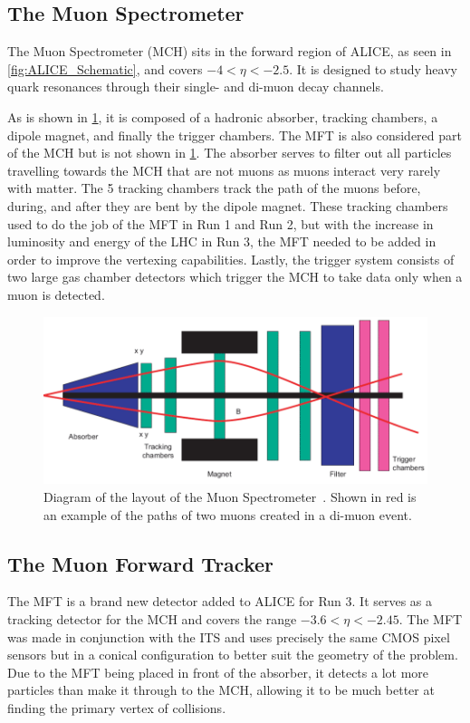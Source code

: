 \documentclass[11pt]{article}
\numberwithin{equation}{section}
\numberwithin{figure}{section}
\numberwithin{table}{section}
\begin{document}
\subsection{The Muon Spectrometer}
The Muon Spectrometer (MCH) sits in the forward region of ALICE, as seen in \cref{fig:ALICE_Schematic}, and covers $-4<\eta<-2.5$. It is designed to study heavy quark resonances through their single- and di-muon decay channels.

As is shown in \cref{fig:Muon Spectrometer}, it is composed of a hadronic absorber, tracking chambers, a dipole magnet, and finally the trigger chambers. The MFT is also considered part of the MCH but is not shown in \cref{fig:Muon Spectrometer}. The absorber serves to filter out all particles travelling towards the MCH that are not muons as muons interact very rarely with matter. The 5 tracking chambers track the path of the muons before, during, and after they are bent by the dipole magnet. These tracking chambers used to do the job of the MFT in Run 1 and Run 2, but with the increase in luminosity and energy of the LHC in Run 3, the MFT needed to be added in order to improve the vertexing capabilities. Lastly, the trigger system consists of two large gas chamber detectors which trigger the MCH to take data only when a muon is detected.

\begin{figure}[h]
    \begin{center}
        \includegraphics[width=\textwidth]{Figs/MCH_schematic.png}
        \caption{Diagram of the layout of the Muon Spectrometer~\cite{Muon_Spec_Schematic}. Shown in red is an example of the paths of two muons created in a di-muon event.}
        \label{fig:Muon Spectrometer}
    \end{center}
\end{figure}

\subsection{The Muon Forward Tracker}
The MFT is a brand new detector added to ALICE for Run 3. It serves as a tracking detector for the MCH and covers the range $-3.6<\eta<-2.45$. The MFT was made in conjunction with the ITS and uses precisely the same CMOS pixel sensors but in a conical configuration to better suit the geometry of the problem. Due to the MFT being placed in front of the absorber, it detects a lot more particles than make it through to the MCH, allowing it to be much better at finding the primary vertex of collisions.
\end{document}
